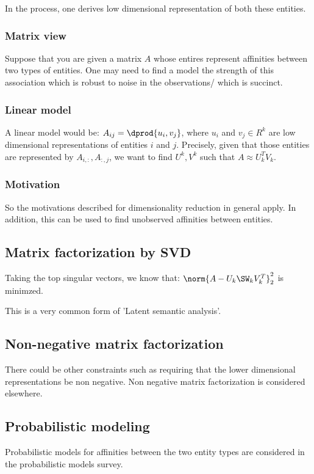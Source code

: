 \documentclass[oneside, article]{memoir}
\begin{document}
In the process, one derives low dimensional representation of both these entities. 

\subsubsection{Matrix view}
Suppose that you are given a matrix $A$ whose entires represent affinities between two types of entities. One may need to find a model the strength of this association which is robust to noise in the observations/ which is succinct.

\subsubsection{Linear model}
A linear model would be: $A_{ij} = \dprod{u_i, v_j}$, where $u_i$ and $v_j \in R^k$ are low dimensional representations of entities $i$ and $j$. Precisely, given that those entities are represented by $A_{i,:}, A_{:,j}$, we want to find $U^{k}, V^{k}$ such that $A \approx U_k^{T} V_k$.

\subsubsection{Motivation}
So the motivations described for dimensionality reduction in general apply. In addition, this can be used to find unobserved affinities between entities.

\subsection{Matrix factorization by SVD}
Taking the top singular vectors, we know that: $\norm{A - U_k \SW_k V_k ^T}_2^2$ is minimzed.

This is a very common form of 'Latent semantic analysis'.

\subsection{Non-negative matrix factorization}
There could be other constraints such as requiring that the lower dimensional representations be non negative. Non negative matrix factorization is considered elsewhere.

\subsection{Probabilistic modeling}
Probabilistic models for affinities between the two entity types are considered in the probabilistic models survey.
\end{document}
